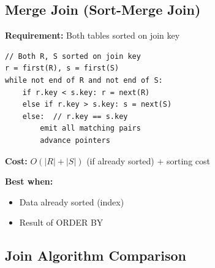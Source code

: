 \subsection{Merge Join (Sort-Merge Join)}

\begin{algorithmbox}
\textbf{Requirement:} Both tables sorted on join key

\begin{lstlisting}[language=pseudo]
// Both R, S sorted on join key
r = first(R), s = first(S)
while not end of R and not end of S:
    if r.key < s.key: r = next(R)
    else if r.key > s.key: s = next(S)
    else:  // r.key == s.key
        emit all matching pairs
        advance pointers
\end{lstlisting}

\textbf{Cost:} $O(|R| + |S|)$ (if already sorted) + sorting cost

\textbf{Best when:}
\begin{itemize}
    \item Data already sorted (index)
    \item Result of ORDER BY
\end{itemize}
\end{algorithmbox}

\subsection{Join Algorithm Comparison}

\begin{center}
\end{center}

